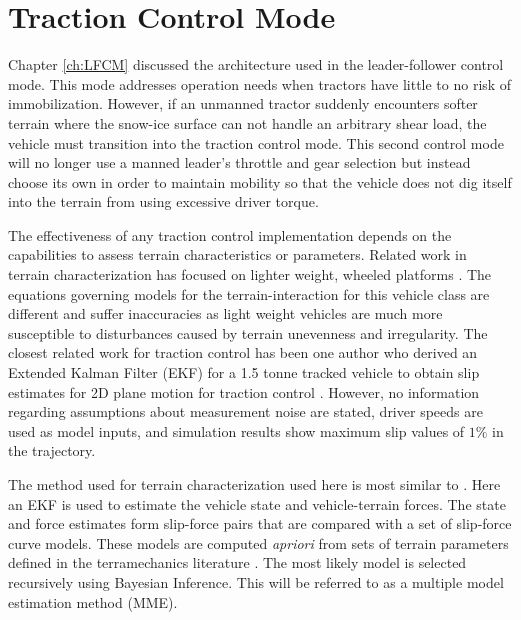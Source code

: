 \chapter{Traction Control Mode} \label{ch:TCM}
Chapter \ref{ch:LFCM} discussed the architecture used in the leader-follower control mode. This mode addresses operation needs when tractors have little to no risk of immobilization. However, if an unmanned tractor suddenly encounters softer terrain where the snow-ice surface can not handle an arbitrary shear load, the vehicle must transition into the traction control mode. This second control mode will no longer use a manned leader's throttle and gear selection but instead choose its own in order to maintain mobility so that the vehicle does not dig itself into the terrain from using excessive driver torque.

The effectiveness of any traction control implementation depends on the capabilities to assess terrain characteristics or parameters. Related work in terrain characterization has focused on lighter weight, wheeled platforms \cite{iagnemma2004online,hutangkabodee2006soil,ojeda2006terrain,ray2009estimationTerrainForcesParameters,ray2009estimationNetTraction}. The equations governing models for the terrain-interaction for this vehicle class are different and suffer inaccuracies as light weight vehicles are much more susceptible to disturbances caused by terrain unevenness and irregularity. The closest related work for traction control has been one author who derived an Extended Kalman Filter (EKF) for a 1.5 tonne tracked vehicle to obtain slip estimates for 2D plane motion for traction control \cite{le1997estimation}. However, no information regarding assumptions about measurement noise are stated, driver speeds are used as model inputs, and simulation results show maximum slip values of $1\%$ in the trajectory.

The method used for terrain characterization used here is most similar to \cite{ray2009estimationTerrainForcesParameters}. Here an EKF is used to estimate the vehicle state and vehicle-terrain forces. The state and force estimates form slip-force pairs that are compared with a set of slip-force curve models. These models are computed \textit{apriori} from sets of terrain parameters defined in the terramechanics literature \cite{Wong2008}. The most likely model is selected recursively using Bayesian Inference. This will be referred to as a multiple model estimation method (MME). 

